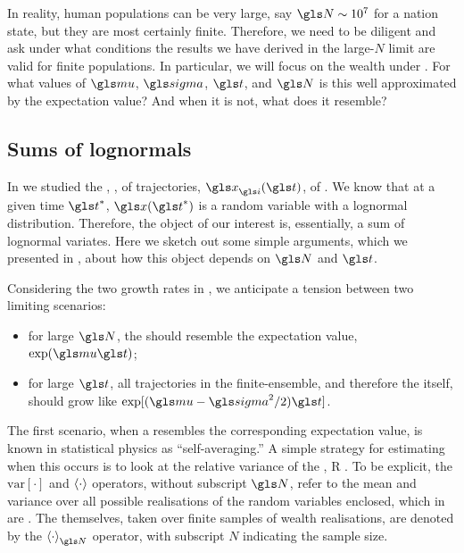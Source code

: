 In reality, human populations can be very large, say $\N\sim10^7$ for a nation state, but they are most certainly finite. Therefore, we need to be diligent and ask under what conditions the results we have derived in the large-$N$ limit are valid for finite populations. In particular, we will focus on the \FEA wealth under \GBM. For what values of $\gmu$, $\gsigma$, $\t$, and $\N$ is this well approximated by the expectation value? And when it is not, what does it resemble?

\subsection{Sums of lognormals}
In \cite{PetersKlein2013} we studied the \FEA, , of trajectories, $\x_\gi(\t)$, of \GBM. We know that at a given time $\t^\ast$, $\x(\t^\ast)$ is a random variable with a lognormal distribution. Therefore, the object of our interest is, essentially, a sum of lognormal variates. Here we sketch out some simple arguments, which we presented in \cite{PetersAdamou2018b}, about how this object depends on $\N$ and $\t$.

Considering the two growth rates in , we anticipate a tension between two limiting scenarios:
\begin{itemize}
\item for large $\N$, the \FEA should resemble the expectation value, $\exp(\gmu \t)$;
\item for large $\t$, all trajectories in the finite-ensemble, and therefore the \FEA itself, should grow like $\exp[(\gmu-\gsigma^2/2)\t]$.
\end{itemize}
The first scenario, when a \FEA resembles the corresponding expectation value, is known in statistical physics as ``self-averaging.'' A simple strategy for estimating when this occurs is to look at the relative variance of the \FEA,
\be
R \equiv {}.
\ee
To be explicit, the $\text{var}[\cdot]$ and $\left\langle\cdot\right\rangle$ operators, without subscript $\N$, refer to the mean and variance over all possible realisations of the random variables enclosed, which in  are \FEAs. The \FEAs themselves, taken over finite samples of wealth realisations, are denoted by the $\ave{\cdot}_\N$ operator, with subscript $N$ indicating the sample size.

